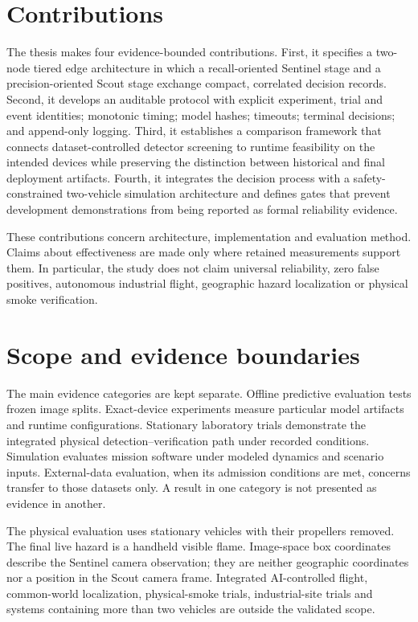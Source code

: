 \section{Contributions}
\label{sec:introduction:contributions}

The thesis makes four evidence-bounded contributions. First, it specifies a
two-node tiered edge architecture in which a recall-oriented Sentinel
stage and a precision-oriented Scout stage exchange compact, correlated
decision records. Second, it develops an auditable protocol with explicit
experiment, trial and event identities; monotonic timing; model hashes;
timeouts; terminal decisions; and append-only logging. Third, it establishes a
comparison framework that connects dataset-controlled detector screening to
runtime feasibility on the intended devices while preserving the distinction
between historical and final deployment artifacts. Fourth, it integrates the
decision process with a safety-constrained two-vehicle simulation architecture
and defines gates that prevent development demonstrations from being reported
as formal reliability evidence.

These contributions concern architecture, implementation and evaluation
method. Claims about effectiveness are made only where retained measurements
support them. In particular, the study does not claim universal reliability,
zero false positives, autonomous industrial flight, geographic hazard
localization or physical smoke verification.

\section{Scope and evidence boundaries}
\label{sec:introduction:scope}

The main evidence categories are kept separate. Offline predictive evaluation
tests frozen image splits. Exact-device experiments measure particular model
artifacts and runtime configurations. Stationary laboratory trials demonstrate
the integrated physical detection--verification path under recorded
conditions. Simulation evaluates mission software under modeled dynamics and
scenario inputs. External-data evaluation, when its admission conditions are
met, concerns transfer to those datasets only. A result in one category is not
presented as evidence in another.

The physical evaluation uses stationary vehicles with their propellers
removed. The final live hazard is a handheld visible flame. Image-space box
coordinates describe the Sentinel camera observation; they are neither
geographic coordinates nor a position in the Scout camera frame. Integrated
AI-controlled flight, common-world localization, physical-smoke trials,
industrial-site trials and systems containing more than two vehicles are
outside the validated scope.

